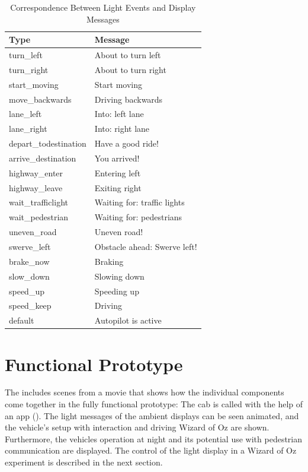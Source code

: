 \begin{table}[ht]
\caption{Correspondence Between Light Events and Display Messages}
\label{tab:display}
\footnotesize
\begin{tabular}{ll}
\toprule
Type        &  Message                      \\
\midrule
turn\_left            & About to turn left           \\
turn\_right           & About to turn right          \\
start\_moving         & Start moving                 \\
move\_backwards       & Driving backwards            \\
lane\_left            & Into: left lane              \\
lane\_right           & Into: right lane             \\
depart\_todestination & Have a good ride!            \\
arrive\_destination   & You arrived!                 \\
highway\_enter        & Entering left                \\
highway\_leave        & Exiting right                \\
wait\_trafficlight    & Waiting for: traffic lights  \\
wait\_pedestrian      & Waiting for: pedestrians     \\
uneven\_road          & Uneven road!                 \\
swerve\_left          & Obstacle ahead: Swerve left! \\
brake\_now            & Braking                      \\
slow\_down            & Slowing down                 \\
speed\_up             & Speeding up                  \\
speed\_keep           & Driving                      \\
default               & Autopilot is active         
\end{tabular}
\end{table}

\section{Functional Prototype}
\label{sec:funcPrototype}

The \emph{} includes scenes from a movie that shows how the individual components come together in the fully functional prototype: The cab is called with the help of an app (\emph{}). The light messages of the ambient displays can be seen animated, and the vehicle's setup with interaction and driving Wizard of Oz are shown. Furthermore, the vehicles operation at night and its potential use with pedestrian communication are displayed. The control of the light display in a Wizard of Oz experiment is described in the next section. 


